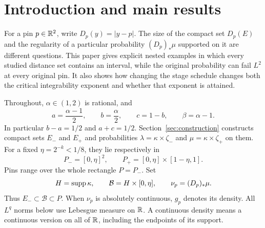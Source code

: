 \section{Introduction and main results}\label{sec:introduction}
For a pin $p\in\mathbb R^2$, write $D_p(y)=|y-p|$. The size of the compact
set $D_p(E)$ and the regularity of a particular probability
$(D_p)_*\mu$ supported on it are different questions. This paper gives
explicit nested examples in which every studied distance set contains an
interval, while the original probability can fail $L^2$ at every original
pin. It also shows how changing the stage schedule changes both the critical
integrability exponent and whether that exponent is attained.

Throughout, $\alpha\in(1,2)$ is rational, and
\begin{equation}\label{eq:parameters}
 a=\frac{\alpha-1}{2},\qquad b=\frac\alpha2,\qquad
 c=1-b,\qquad \beta=\alpha-1.
\end{equation}
In particular $b-a=1/2$ and $a+c=1/2$. Section~\ref{sec:construction}
constructs compact sets $E_-$ and $E_+$ and probabilities
$\lambda=\kappa\times\zeta_-$ and $\mu=\kappa\times\zeta_+$ on them.
For a fixed $\eta=2^{-k}<1/8$, they lie respectively in
\[
 P_-=[0,\eta]^2,\qquad P_+=[0,\eta]\times[1-\eta,1].
\]
Pins range over the whole rectangle $P=P_-$. Set
\[
 H=\operatorname{supp}\kappa,\qquad \mathcal B=H\times[0,\eta],\qquad
 \nu_p=(D_p)_*\mu.
\]
Thus $E_-\subset\mathcal B\subset P$. When $\nu_p$ is absolutely
continuous, $g_p$ denotes its density. All $L^q$ norms below use Lebesgue
measure on $\mathbb R$. A continuous density means a continuous version on all of
$\mathbb R$, including the endpoints of its support.

